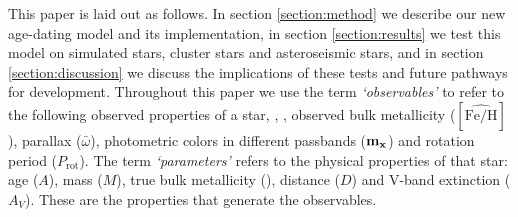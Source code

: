 This paper is laid out as follows.
In section \ref{section:method} we describe our new age-dating model and its
implementation, in section \ref{section:results} we test this model on
simulated stars, cluster stars and asteroseismic stars, and in section
\ref{section:discussion} we discuss the implications of these tests and future
pathways for development.
Throughout this paper we use the term {\it `observables'} to refer to the
following observed properties of a star, \teff, \logg, observed bulk
metallicity ($[\hat{\mathrm{Fe/H}}]$), parallax ($\bar{\omega}$), photometric
colors in different passbands ($\bf{m_x}$) and rotation period
($P_{\mathrm{rot}}$).
The term {\it `parameters'} refers to the physical properties of that star:
age ($A$), mass ($M$), true bulk metallicity (\feh), distance ($D$) and V-band
extinction ($A_V$).
These are the properties that generate the observables.
